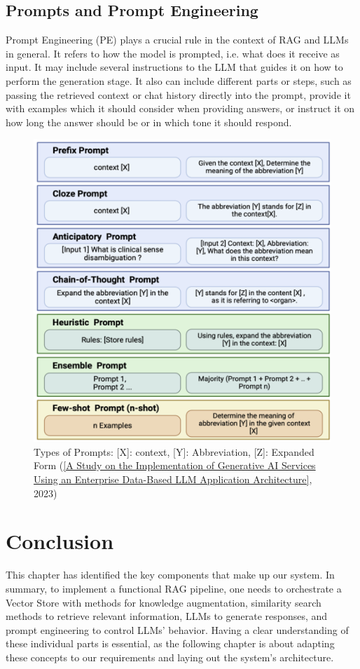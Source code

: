 \subsection{Prompts and Prompt Engineering}
Prompt Engineering (PE) plays a crucial rule in the context of RAG and LLMs in general. It refers to how the model is prompted, i.e. what does it receive as input. It may include several instructions to the LLM that guides it on how to perform the generation stage. It also can include different parts or steps, such as passing the retrieved context or chat history directly into the prompt, provide it with examples which it should consider when providing answers, or instruct it on how long the answer should be or in which tone it should respond.
\begin{figure}[htbp]
    \centering
    \includegraphics[width=\linewidth]{./figures/prompt-types.png}
    \caption{Types of Prompts: [X]: context, [Y]: Abbreviation, [Z]: Expanded Form
    (\href{https://www.oajaiml.com/uploads/archivepdf/63501191.pdf}{[A Study on the Implementation of Generative AI Services Using an Enterprise Data-Based LLM Application Architecture]}, 2023)}
\end{figure}

\section{Conclusion}
This chapter has identified the key components that make up our system. In summary, to implement a functional RAG pipeline, one needs to orchestrate a Vector Store with methods for knowledge augmentation, similarity search methods to retrieve relevant information, LLMs to generate responses, and prompt engineering to control LLMs' behavior. Having a clear understanding of these individual parts is essential, as the following chapter is about adapting these concepts to our requirements and laying out the system's architecture.